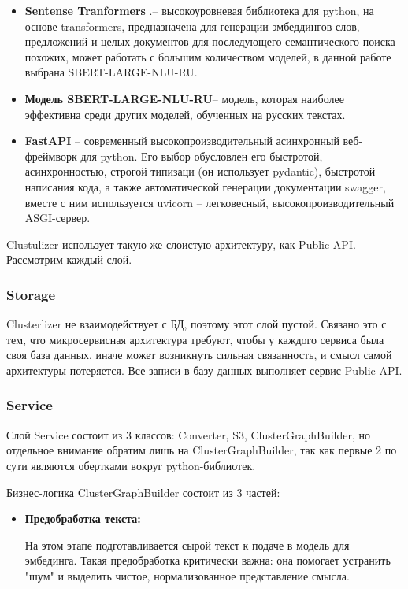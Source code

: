 \begin{itemize}
\begin{itemize}
\item  \textbf{Sentense Tranformers }.– высокоуровневая библиотека для python, на основе transformers, предназначена для генерации эмбеддингов слов, предложений и целых документов для последующего семантического поиска похожих, может работать с большим количеством моделей, в данной работе выбрана SBERT-LARGE-NLU-RU.
\item \textbf{Модель SBERT-LARGE-NLU-RU}– модель, которая наиболее эффективна среди других моделей, обученных на русских текстах.
\item \textbf{FastAPI }– современный высокопроизводительный асинхронный веб-фреймворк для python. Его выбор обусловлен его быстротой, асинхронностью, строгой типизаци (он использует pydantic), быстротой написания кода, а также автоматической генерации документации swagger, вместе с ним используется uvicorn – легковесный, высокопроизводительный ASGI-сервер.
\end{itemize}

Clustulizer использует такую же слоистую архитектуру, как Public API.
Рассмотрим каждый слой.
\subsubsection{Storage}
Clusterlizer не взаимодействует с БД, поэтому этот слой пустой. Связано это с тем, что микросервисная архитектура требуют, чтобы у каждого сервиса была своя база данных, иначе может возникнуть сильная связанность, и смысл самой архитектуры потеряется. Все записи в базу данных выполняет сервис Public API.
\subsubsection{Service}

 Слой Service состоит из 3 классов: Converter, S3, ClusterGraphBuilder, но отдельное внимание обратим лишь на ClusterGraphBuilder, так как первые 2 по сути являются обертками вокруг python-библиотек.

Бизнес-логика ClusterGraphBuilder состоит из 3 частей:

 \begin{itemize}
\item  \textbf{Предобработка текста:}

На этом этапе подготавливается сырой текст к подаче в модель для эмбединга. Такая предобработка критически важна: она помогает устранить "шум" и выделить чистое, нормализованное представление смысла.


\end{itemize}
\end{itemize}

